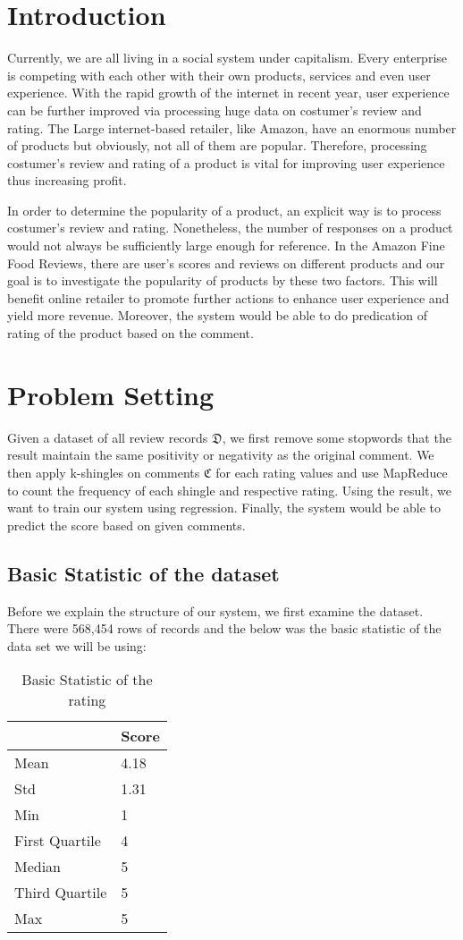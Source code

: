 \section{Introduction}
Currently, we are all living in a social system under capitalism. Every enterprise is competing with each other with their own products, services and even user experience. With the rapid growth of the internet in recent year, user experience can be further improved via processing huge data on costumer's review and rating. The Large internet-based retailer, like Amazon, have an enormous number of products but obviously, not all of them are popular. Therefore, processing costumer's review and rating of a product is vital for improving user experience thus increasing profit.

In order to determine the popularity of a product, an explicit way is to process costumer's review and rating. Nonetheless, the number of responses on a product would not always be sufficiently large enough for reference. In the Amazon Fine Food Reviews, there are user's scores and reviews on different products and our goal is to investigate the popularity of products by these two factors. This will benefit online retailer to promote further actions to enhance user experience and yield more revenue. Moreover, the system would be able to do predication of rating of the product based on the comment.


\section{Problem Setting}
Given a dataset of all review records \(\mathfrak{D}\), we first remove some stopwords that the result maintain the same positivity or negativity as the original comment. We then apply k-shingles on comments \(\mathfrak{C}\) for each rating values and use MapReduce to count the frequency of each shingle and respective rating. Using the result, we want to train our system using regression. Finally, the system would be able to predict the score based on given comments.

\subsection{Basic Statistic of the dataset}
Before we explain the structure of our system, we first examine the dataset. There were 568,454 rows of records and the below was the basic statistic of the data set we will be using:
\begin{table}[H]
  \caption{Basic Statistic of the rating}
  \label{tab:commands}
  \begin{tabular}{ll}
  	\toprule
    & Score \\ 
    \midrule
    Mean & 4.18 \\
    Std & 1.31 \\ 
    Min & 1 \\
    First Quartile & 4 \\
    Median & 5 \\
    Third Quartile & 5 \\
    Max & 5 \\ 
    \bottomrule
  \end{tabular}
\end{table}

